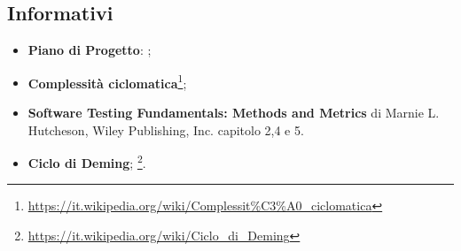 \subsection{Informativi}
\label{RiferimentiInformativi}
\begin{itemize}
	\item \textbf{Piano di Progetto}: \pianodiprogetto;
	\item \textbf{Complessità ciclomatica}\footnote{\url{https://it.wikipedia.org/wiki/Complessit\%C3\%A0_ciclomatica}};
	\item \textbf{Software Testing Fundamentals: Methods and Metrics} di Marnie L. Hutcheson, Wiley Publishing, Inc. capitolo 2,4 e 5.
	\item \textbf{Ciclo di Deming};
	\footnote{\url{https://it.wikipedia.org/wiki/Ciclo_di_Deming}}.
\end{itemize}
